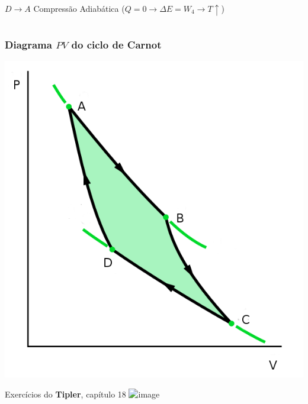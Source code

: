 \documentclass[t,%
brazilian,%
11pt,%
aspectratio=169,%
table%
]{beamer}
\begin{document}
\begin{frame}
\begin{columns}
\begin{column}{0.45\textwidth}
            \(D \rightarrow A\) Compressão Adiabática (\(Q=0 \rightarrow \Delta E = W_4 \rightarrow T \uparrow \))
        \end{column}
    \end{columns}
\end{frame}

\begin{frame}
    \frametitle{Diagrama \(PV\) do ciclo de Carnot}
    \centering
    \includegraphics[height=\textheight-27pt]{images/carnot-ciclo.png}
\end{frame}

\begin{frame}{Exercícios do \textbf{Tipler}, capítulo 18}
    \centering
    \includegraphics<+>[width=\textwidth]{images/Captura de tela de 2024-03-05 11-38-10.png}
\end{frame}
\end{document}
